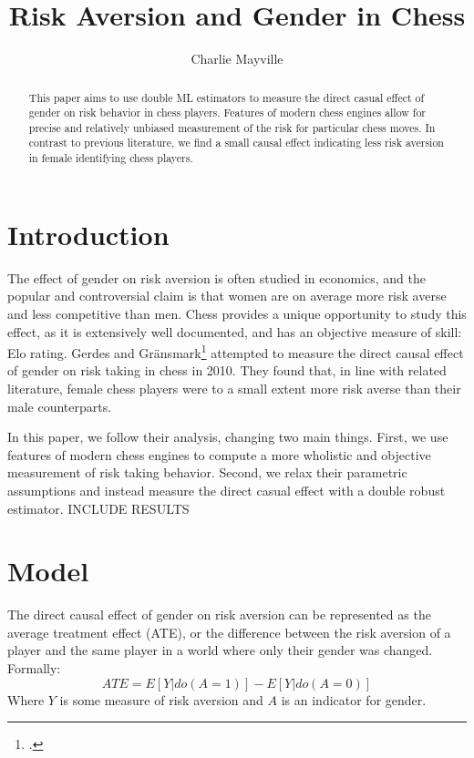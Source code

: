 \documentclass[letterpaper, 11pt]{article}
\title{Risk Aversion and Gender in Chess}
\author{Charlie Mayville}
\begin{document}
\maketitle

    \begin{abstract}
        This paper aims to use double ML estimators to measure the direct casual effect of gender on risk behavior in chess players.
        Features of modern chess engines allow for precise and relatively unbiased measurement of the risk for particular chess moves.
        In contrast to previous literature, we find a small causal effect indicating less risk aversion in female identifying chess players.
    \end{abstract}

    \section*{Introduction}
        The effect of gender on risk aversion is often studied in economics, and the popular and controversial claim is that women are on average more risk averse and less competitive than men.
        Chess provides a unique opportunity to study this effect, as it is extensively well documented, and has an objective measure of skill: Elo rating.
        Gerdes and Gränsmark\footcite{gerdes:gender} attempted to measure the direct causal effect of gender on risk taking in chess in 2010.
        They found that, in line with related literature, female chess players were to a small extent more risk averse than their male counterparts.
    
        In this paper, we follow their analysis, changing two main things. 
        First, we use features of modern chess engines to compute a more wholistic and objective measurement of risk taking behavior. 
        Second, we relax their parametric assumptions and instead measure the direct casual effect with a double robust estimator.
        INCLUDE RESULTS

    \section*{Model}
        The direct causal effect of gender on risk aversion can be represented as the average treatment effect (ATE), or the difference between the risk aversion of a player and the same player in a world where only their gender was changed.
        Formally:
        $$ ATE = E[ Y | do( A = 1) ] - E[ Y | do ( A = 0) ] $$
        Where $Y$ is some measure of risk aversion and $A$ is an indicator for gender.
    
\end{document}
